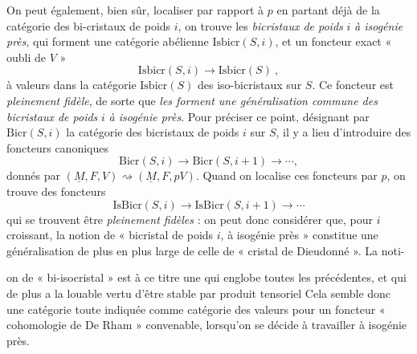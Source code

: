 \documentclass[11pt,a4paper]{article}
\begin{document}
On peut également, bien sûr, localiser par rapport à $p$ en partant déjà de la
catégorie des bi-cristaux de poids $i$, on trouve les \emph{bicristaux de
poids} $i$ \emph{à isogénie près}, qui forment une catégorie abélienne
$\mathrm{Isbicr}(S,i)$, et un foncteur exact « oubli de $V$ »
\[
  \mathrm{Isbicr}(S,i)\longrightarrow\mathrm{Isbicr}(S)\ ,
\]
à valeurs dans la catégorie $\mathrm{Isbicr}(S)$ des iso-bicristaux sur $S$.
 Ce foncteur est  \emph{pleinement
fidèle}, de sorte que \emph{les  forment une
généralisation commune des bicristaux de poids} $i$ \emph{à isogénie près}.
 Pour préciser ce point,
désignant par $\mathrm{Bicr}(S,i)$ la catégorie des bicristaux de poids $i$ sur
$S$, il y a lieu d'introduire des foncteurs canoniques
\[
  \mathrm{Bicr}(S,i)\longrightarrow\mathrm{Bicr}(S,i+1)\longrightarrow\cdots,
\]
donnés par $(\underline{M},F,V)\rightsquigarrow(\underline{M},F,pV)$. Quand on
localise ces foncteurs par $p$, on trouve des foncteurs
\[
  \mathrm{IsBicr}(S,i)\longrightarrow\mathrm{IsBicr}(S,i+1)\longrightarrow\cdots
\]
qui se trouvent être \emph{pleinement fidèles} : on peut donc considérer que,
pour $i$ croissant, la notion de « bicristal de poids $i$, à isogénie près »
constitue une généralisation de plus en plus large de celle de « cristal de
Dieudonné ». La noti-

on de « bi-isocristal » est à ce titre une \struck{\ill{}}
 qui englobe toutes les précédentes, et qui de plus a la
louable vertu d'être stable par produit tensoriel
Cela semble donc une catégorie toute indiquée comme catégorie des valeurs pour
un foncteur « cohomologie de De Rham » convenable, lorsqu'on se décide à
travailler à isogénie près.
\end{document}
